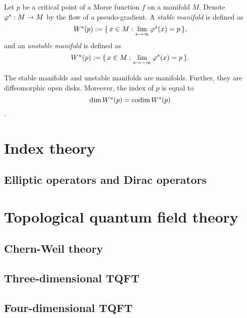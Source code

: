\documentclass{../../large}
\begin{document}
\begin{defn}
Let $p$ be a critical point of a Morse function $f$ on a manifold $M$.
Denote $\varphi^s:M\to M$ by the flow of a pseudo-gradient.
A \emph{stable manifold} is defined as
\[W^s(p):=\{\,x\in M:\lim_{s\to\infty}\varphi^s(x)=p\,\},\]
and an \emph{unstable manifold} is defined as
\[W^u(p):=\{\,x\in M:\lim_{s\to-\infty}\varphi^s(x)=p\,\}.\]
\end{defn}
\begin{prop}
The stable manifolds and unstable manifolds are manifolds.
Further, they are diffeomorphic open disks.
Moreover, the index of $p$ is equal to
\[\dim W^u(p)=\operatorname{codim} W^s(p)\].
\end{prop}


\chapter{}
\chapter{}


\part{Index theory}
\chapter{Elliptic operators and Dirac operators}
\chapter{}
\chapter{}

\part{Topological quantum field theory}
\chapter{Chern-Weil theory}
\chapter{Three-dimensional TQFT}
\chapter{Four-dimensional TQFT}
\end{document}
